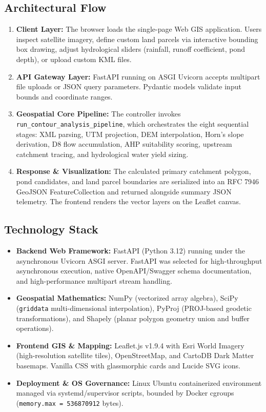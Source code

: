 \documentclass[manuscript,screen,review]{acmart}
\begin{document}
\subsection{Architectural Flow}
\begin{enumerate}
    \item \textbf{Client Layer:} The browser loads the single-page Web GIS application. Users inspect satellite imagery, define custom land parcels via interactive bounding box drawing, adjust hydrological sliders (rainfall, runoff coefficient, pond depth), or upload custom KML files.
    \item \textbf{API Gateway Layer:} FastAPI running on ASGI Uvicorn accepts multipart file uploads or JSON query parameters. Pydantic models validate input bounds and coordinate ranges.
    \item \textbf{Geospatial Core Pipeline:} The controller invokes \texttt{run\_contour\_analysis\_pipeline}, which orchestrates the eight sequential stages: XML parsing, UTM projection, DEM interpolation, Horn's slope derivation, D8 flow accumulation, AHP suitability scoring, upstream catchment tracing, and hydrological water yield sizing.
    \item \textbf{Response \& Visualization:} The calculated primary catchment polygon, pond candidates, and land parcel boundaries are serialized into an RFC 7946 GeoJSON FeatureCollection and returned alongside summary JSON telemetry. The frontend renders the vector layers on the Leaflet canvas.
\end{enumerate}

\subsection{Technology Stack}
\begin{itemize}
    \item \textbf{Backend Web Framework:} FastAPI (Python 3.12) running under the asynchronous Uvicorn ASGI server. FastAPI was selected for high-throughput asynchronous execution, native OpenAPI/Swagger schema documentation, and high-performance multipart stream handling.
    \item \textbf{Geospatial Mathematics:} NumPy (vectorized array algebra), SciPy (\texttt{griddata} multi-dimensional interpolation), PyProj (PROJ-based geodetic transformations), and Shapely (planar polygon geometry union and buffer operations).
    \item \textbf{Frontend GIS \& Mapping:} Leaflet.js v1.9.4 with Esri World Imagery (high-resolution satellite tiles), OpenStreetMap, and CartoDB Dark Matter basemaps. Vanilla CSS with glassmorphic cards and Lucide SVG icons.
    \item \textbf{Deployment \& OS Governance:} Linux Ubuntu containerized environment managed via systemd/supervisor scripts, bounded by Docker cgroups (\texttt{memory.max = 536870912} bytes).
\end{itemize}
\end{document}
